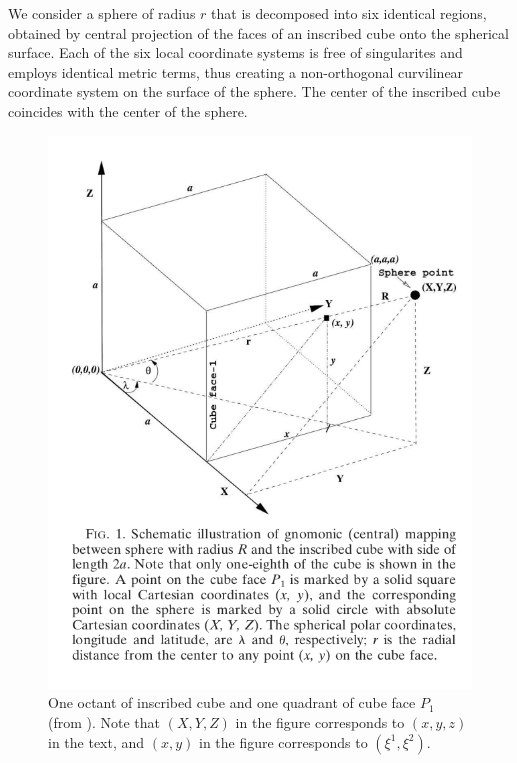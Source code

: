 \documentclass{report}
\begin{document}
We consider a sphere of radius $r$ that is decomposed into six identical regions, obtained by central projection of the faces of an inscribed cube onto the spherical surface. Each of the six local coordinate systems is free of singularites and employs identical metric terms, thus creating a non-orthogonal curvilinear coordinate system on the surface of the sphere. The center of the inscribed cube coincides with the center of the sphere. 
\begin{figure}
    \centering
    \includegraphics[scale=0.4,trim=0cm 9cm 0cm 0cm, clip]{CLIMA-atmos/figures/numerics/NairFig1.png}
    \caption{One octant of inscribed cube and one quadrant of cube face $P_1$ (from \cite{Nair2005}). Note that $(X,Y,Z)$ in the figure corresponds to $(x,y,z)$ in the text, and $(x,y)$ in the figure corresponds to $(\xi^1,\xi^2)$.}
    \label{fig:NairFig1}
\end{figure}
\end{document}
